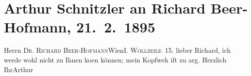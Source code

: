 

         
         \renewcommand{\erwaehntePersonen}{Personen: Richard Beer-Hofmann}
         \renewcommand{\erwaehnteOrte}{Orte: I., Innere Stadt, Wien, Wollzeile}
         \renewcommand{\erwaehnteWerke}{}
               \section[Arthur Schnitzler an Richard Beer-Hofmann, 21. 2. 1895]{ Arthur Schnitzler an Richard Beer-Hofmann, 21. 2. 1895}\nopagebreak{}\rehead{ }\begin{ledgroupsized}[t]{13cm}\normalsize\beginnumbering \toendnotes[C]{\smallbreak\pagebreak[2]} 
\pstart{}{\pb}Herrn \textsc{Dr. Richard
                     Beer-Hofmann}\pend{}\pstart{}Wien\pend{}\pstart{}\textsc{I. Wollzeile 15}.\pend{}{\bigskip}\pstart
           \noindent{}{\pb}lieber Richard, ich werde wohl nicht zu
               Ihnen ko{\geminationm}en können; mein Kopfweh iſt zu arg.\pend
           \pstart Herzlich Ihr\spacefill\mbox{Arthur}\pend{}
         
         \endnumbering{}\end{ledgroupsized}  \newcommand{\dateiname}{L00422}\newcommand{\titel}{Arthur Schnitzler an Richard Beer-Hofmann, 21. 2. 1895}\newcommand{\editorInnen}{Martin Anton Müller und Gerd-Hermann Susen}
      